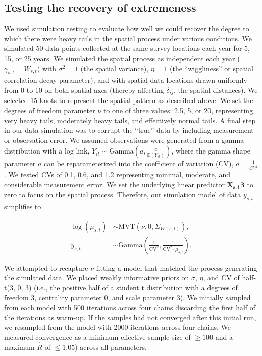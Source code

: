 \documentclass[12pt,english]{article}
\begin{document}
\begin{spacing}{1.3}

\subsection{Testing the recovery of extremeness}

We used simulation testing to evaluate how well we could recover the degree to
which there were heavy tails in the spatial process under various conditions.
We simulated 50 data points collected at the same survey locations each year
for 5, 15, or 25 years. We simulated the spatial process as independent each
year ($\gamma_{s,t} = W_{s,t}$) with $\sigma^2 = 1$ (the spatial variance),
$\eta = 1$ (the ``wiggliness'' or spatial correlation decay parameter), and
with spatial data locations drawn uniformly from 0 to 10 on both spatial axes
(thereby affecting $\delta_{ij}$, the spatial distances).
We selected 15 knots to represent the spatial pattern as described above.
We set the degrees of freedom parameter $\nu$ to
one of three values: 2.5, 5, or 20, representing very heavy tails, moderately heavy
tails, and effectively normal tails. A final step in our data
simulation was to corrupt the ``true'' data by including measurement or
observation error. We assumed observations were generated from a gamma
distribution with a log link, $Y_{it}\sim \mathrm{Gamma}\left(a,\frac
  {a}{\mathbb{E}(Y_{it})} \right)$, where the gamma shape parameter $a$ can be
reparameterized into the coefficient of variation (CV), $a=\frac{1}{CV^2}$. We
tested CVs of 0.1, 0.6, and 1.2 representing minimal, moderate, and
considerable measurement error. We set the underlying linear predictor
$\bm{X_{s,t}} \bm{\beta}$ to zero to focus on the spatial process. Therefore,
our simulation model of data $y_{s,t}$ simplifies to

\begin{align}
  \log(\mu_{s,t}) &\sim \mathrm{MVT}\left(\nu, 0, \Sigma_{W(s,t)}\right),\\
  y_{s,t} &\sim \mathrm{Gamma} \left( \frac{1}{\mathrm{CV}^2},
  \frac{1}{\mathrm{CV}^2 \cdot \mu_{s,t} } \right).
\end{align}

We attempted to recapture $\nu$ fitting a model that matched the process
generating the simulated data. We placed weakly informative priors on $\sigma$,
$\eta$, and CV of half-t(3, 0, 3) (i.e., the positive half of a student t
distribution with a degrees of freedom 3, centrality parameter 0, and scale
parameter 3). We initially sampled from each model with 500 iterations across
four chains discarding the first half of the iterations as warm-up. If the
samples had not converged after this initial run, we resampled from the model
with 2000 iterations across four chains. We measured convergence as a minimum
effective sample size of $\ge 100$ and a maximum $\hat{R}$ of $\le 1.05$)
across all parameters.


\end{spacing}
\end{document}
